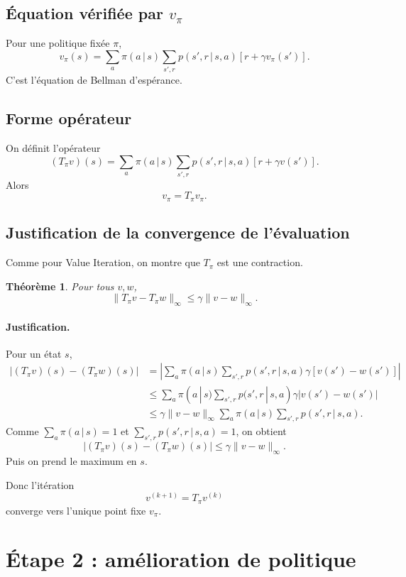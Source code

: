 \documentclass[11pt,a4paper]{article}
\newtheorem*{theoreme}{Théorème}
\newcommand{\given}{\,|\,}
\begin{document}
\subsection{Équation vérifiée par $v_{\pi}$}

Pour une politique fixée $\pi$,
\[
v_{\pi}(s)=\sum_a \pi(a\given s)\sum_{s',r} p(s',r\given s,a)\left[r+\gamma v_{\pi}(s')\right].
\]
C'est l'équation de Bellman d'espérance.

\subsection{Forme opérateur}

On définit l'opérateur
\[
(T_{\pi}v)(s)=\sum_a \pi(a\given s)\sum_{s',r} p(s',r\given s,a)\left[r+\gamma v(s')\right].
\]
Alors
\[
v_{\pi}=T_{\pi}v_{\pi}.
\]

\subsection{Justification de la convergence de l'évaluation}

Comme pour Value Iteration, on montre que $T_{\pi}$ est une contraction.

\begin{theoreme}
Pour tous $v,w$,
\[
\|T_{\pi}v-T_{\pi}w\|_{\infty}\le \gamma\|v-w\|_{\infty}.
\]
\end{theoreme}

\paragraph{Justification.}
Pour un état $s$,
\begin{align*}
|(T_{\pi}v)(s)-(T_{\pi}w)(s)|
&= \left|\sum_a \pi(a\given s)\sum_{s',r}p(s',r\given s,a)\gamma\left[v(s')-w(s')\right]\right| \\
&\le \sum_a \pi(a\given s)\sum_{s',r}p(s',r\given s,a)\gamma |v(s')-w(s')| \\
&\le \gamma \|v-w\|_{\infty}\sum_a \pi(a\given s)\sum_{s',r}p(s',r\given s,a).
\end{align*}
Comme $\sum_a \pi(a\given s)=1$ et $\sum_{s',r}p(s',r\given s,a)=1$, on obtient
\[
|(T_{\pi}v)(s)-(T_{\pi}w)(s)|\le \gamma\|v-w\|_{\infty}.
\]
Puis on prend le maximum en $s$.

Donc l'itération
\[
v^{(k+1)}=T_{\pi}v^{(k)}
\]
converge vers l'unique point fixe $v_{\pi}$.

\section{Étape 2 : amélioration de politique}
\end{document}
